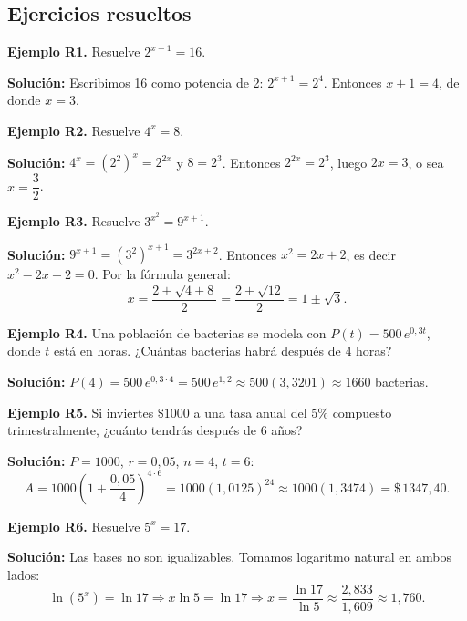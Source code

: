 \documentclass[12pt, a4paper]{article}
\begin{document}
\subsection{Ejercicios resueltos}

\textbf{Ejemplo R1.} Resuelve $2^{x+1} = 16$.

\begin{cuadrosolucion}
  \textbf{Solución:} Escribimos 16 como potencia de 2: $2^{x+1} = 2^4$. Entonces $x + 1 = 4$, de donde $x = 3$.
\end{cuadrosolucion}

\textbf{Ejemplo R2.} Resuelve $4^x = 8$.

\begin{cuadrosolucion}
  \textbf{Solución:} $4^x = (2^2)^x = 2^{2x}$ y $8 = 2^3$. Entonces $2^{2x} = 2^3$, luego $2x = 3$, o sea $x = \dfrac{3}{2}$.
\end{cuadrosolucion}

\textbf{Ejemplo R3.} Resuelve $3^{x^2} = 9^{x+1}$.

\begin{cuadrosolucion}
  \textbf{Solución:} $9^{x+1} = (3^2)^{x+1} = 3^{2x+2}$. Entonces $x^2 = 2x + 2$, es decir $x^2 - 2x - 2 = 0$. Por la fórmula general:
  $$x = \frac{2 \pm \sqrt{4 + 8}}{2} = \frac{2 \pm \sqrt{12}}{2} = 1 \pm \sqrt{3}.$$
\end{cuadrosolucion}

\textbf{Ejemplo R4.} Una población de bacterias se modela con $P(t) = 500\,e^{0{,}3t}$, donde $t$ está en horas. ¿Cuántas bacterias habrá después de 4 horas?

\begin{cuadrosolucion}
  \textbf{Solución:} $P(4) = 500\,e^{0{,}3 \cdot 4} = 500\,e^{1{,}2} \approx 500(3{,}3201) \approx 1660$ bacterias.
\end{cuadrosolucion}

\textbf{Ejemplo R5.} Si inviertes $\$1000$ a una tasa anual del $5\%$ compuesto trimestralmente, ¿cuánto tendrás después de 6 años?

  \begin{cuadrosolucion}
    \textbf{Solución:} $P = 1000$, $r = 0{,}05$, $n = 4$, $t = 6$:
    $$A = 1000\left(1 + \frac{0{,}05}{4}\right)^{4 \cdot 6} = 1000(1{,}0125)^{24} \approx 1000(1{,}3474) = \$\,1347{,}40.$$
  \end{cuadrosolucion}

  \textbf{Ejemplo R6.} Resuelve $5^x = 17$.

  \begin{cuadrosolucion}
    \textbf{Solución:} Las bases no son igualizables. Tomamos logaritmo natural en ambos lados:
    $$\ln(5^x) = \ln 17 \Rightarrow x \ln 5 = \ln 17 \Rightarrow x = \frac{\ln 17}{\ln 5} \approx \frac{2{,}833}{1{,}609} \approx 1{,}760.$$
  \end{cuadrosolucion}
\end{document}
